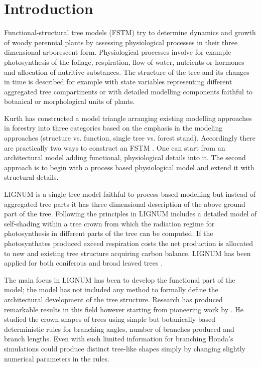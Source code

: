 \section{Introduction}
Functional-structural tree models (FSTM) try to determine dynamics and
growth of woody perennial  plants by assessing physiological processes
in their three  dimensional arborescent form.  Physiological processes
involve for  example photosynthesis of the  foliage, respiration, flow
of  water,   nutrients  or   hormones  and  allocation   of  nutritive
substances.   The structure of  the tree  and its  changes in  time is
described  for  example with  state  variables representing  different
aggregated  tree compartments  or with  detailed  modelling components
faithful to botanical or morphological units of plants.

Kurth  has constructed  a model  triangle  \citep{kurth:94b} arranging
existing modelling approaches in  forestry into three categories based
on the  emphasis in the modeling approaches  (structure vs.  function,
single tree vs.  forest stand).  Accordingly there are practically two
ways to construct an FSTM  \citep{sievanen:00}.  One can start from an
architectural  model   \citep{jaeger:92,kurth:94}  adding  functional,
physiological details into it.  The second approach is to begin with a
process  based  physiological  model  \citep{makela:86,  landsberg:86,
  sievanen:93} and extend it with structural details.

LIGNUM  is  a  single  tree  model  \citep{perttunen:96}  faithful  to
process-based  modelling \citep[see  e.g.][]{nikinmaa:92, sievanen:93,
  makela:97-1}  but instead  of  aggregated tree  parts  it has  three
dimensional  description  of  the  above  ground  part  of  the  tree.
Following the principles in \citet{hari:82} LIGNUM includes a detailed
model  of  self-shading   within  a  tree  crown  \citep{perttunen:96,
  perttunen:01} from which the  radiation regime for photosynthesis in
different parts  of the tree  can be computed.  If  the photosynthates
produced exceed  respiration costs the net production  is allocated to
new and existing tree  structure acquiring carbon balance.  LIGNUM has
been applied for  both coniferous \citep{perttunen:96,lo:99} and broad
leaved trees \citep{perttunen:01}.

The main  focus in LIGNUM has  been to develop the  functional part of
the model;  the model has not  included any method  to formally define
the  architectural development  of the  tree structure.   Research has
produced  remarkable  results  in  this field  however  starting  from
pioneering work  by \citet{honda:71}.  He studied the  crown shapes of
trees  using  simple but  botanically  based  deterministic rules  for
branching  angles, number  of  branches produced  and branch  lengths.
Even with  such limited information for  branching Honda's simulations
could produce  distinct tree-like  shapes simply by  changing slightly
numerical parameters in the rules.

